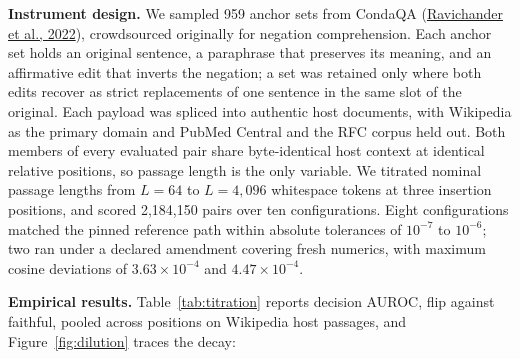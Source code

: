 \documentclass[11pt]{article}
\begin{document}
\textbf{Instrument design.} We sampled 959 anchor sets from CondaQA (\hyperlink{bib:ravichander}{Ravichander et al., 2022}), crowdsourced originally for negation comprehension. Each anchor set holds an original sentence, a paraphrase that preserves its meaning, and an affirmative edit that inverts the negation; a set was retained only where both edits recover as strict replacements of one sentence in the same slot of the original. Each payload was spliced into authentic host documents, with Wikipedia as the primary domain and PubMed Central and the RFC corpus held out. Both members of every evaluated pair share byte-identical host context at identical relative positions, so passage length is the only variable. We titrated nominal passage lengths from $L = 64$ to $L = 4{,}096$ whitespace tokens at three insertion positions, and scored 2,184,150 pairs over ten configurations. Eight configurations matched the pinned reference path within absolute tolerances of $10^{-7}$ to $10^{-6}$; two ran under a declared amendment covering fresh numerics, with maximum cosine deviations of $3.63 \times 10^{-4}$ and $4.47 \times 10^{-4}$.

\textbf{Empirical results.} Table~\ref{tab:titration} reports decision AUROC, flip against faithful, pooled across positions on Wikipedia host passages, and Figure~\ref{fig:dilution} traces the decay:
\end{document}
